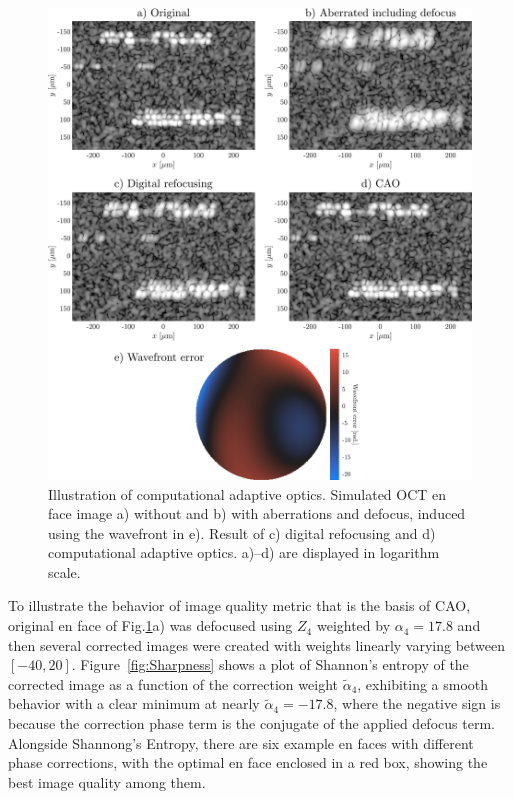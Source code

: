\begin{figure}[htb!]
	\centering
	\includegraphics[width=\textwidth]{Figures/TheoreticalBasis/CAO.pdf}
	\caption{Illustration of computational adaptive optics. Simulated OCT en face image a) without and b) with aberrations and defocus, induced using the wavefront in e). Result of c) digital refocusing and d) computational adaptive optics. a)--d) are displayed in logarithm scale.}
	\label{fig:CAO}
\end{figure}

To illustrate the behavior of image quality metric that is the basis of CAO, original en face of Fig.\ref{fig:CAO}a) was defocused using $Z_4$ weighted by $\alpha_4=17.8$ and then several corrected images were created with weights linearly varying between $[-40, 20]$. Figure~\ref{fig:Sharpness} shows a plot of Shannon's entropy of the corrected image as a function of the correction weight $\tilde{\alpha}_4$, exhibiting a smooth behavior with a clear minimum at nearly $\tilde{\alpha}_4=-17.8$, where the negative sign is because the correction phase term is the conjugate of the applied defocus term. Alongside Shannong's Entropy, there are six example en faces with different phase corrections, with the optimal en face enclosed in a red box, showing the best image quality among them.

